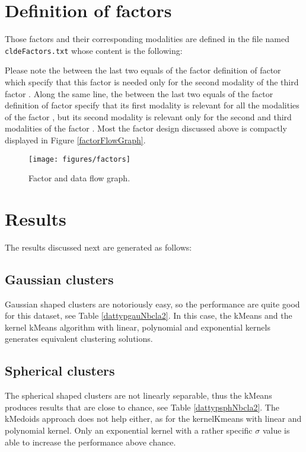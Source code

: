 \documentclass[12pt,a4paper,fleqn]{tufte-handout}
\begin{document}
\section{Definition of factors}

Those factors and their corresponding modalities are defined in the file named \texttt{cldeFactors.txt} whose content is the following:


Please note the  between the last two equals of the factor definition of factor  which specify that this factor is needed only for the second modality of the third factor . Along the same line, the  between the last two equals of the factor definition of factor   specify that its first modality is relevant for all the modalities of the factor , but its second modality is relevant only for the second and third modalities of the factor . Most the factor design discussed above is compactly displayed in Figure \ref{factorFlowGraph}.

\begin{figure}
\texttt{[image: figures/factors]}
\caption{Factor and data flow graph.}
\label{scatter}
\end{figure}

\section{Results}

The results discussed next are generated as follows:


\subsection{Gaussian clusters}

Gaussian shaped clusters are notoriously easy, so the performance are quite good for this dataset, see Table \ref{dattypgauNbcla2}. In this case, the kMeans and the kernel kMeans algorithm with linear, polynomial and exponential kernels generates equivalent clustering solutions.

\subsection{Spherical clusters}

The spherical shaped clusters are not linearly separable, thus the kMeans produces results that are close to chance, see Table \ref{dattypsphNbcla2}. The kMedoids approach does not help either, as for the kernelKmeans with linear and polynomial kernel. Only an exponential kernel with a rather specific $\sigma$ value is able to increase the performance above chance.
\end{document}
